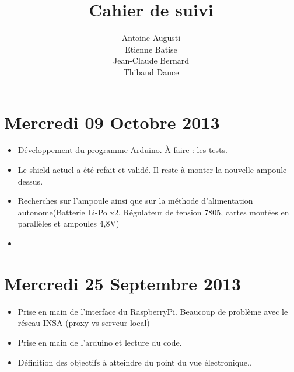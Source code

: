 \documentclass[a4paper, 12pt, french]{article}
\title{Cahier de suivi}
\author{Antoine Augusti\\ Etienne Batise\\ Jean-Claude Bernard\\ Thibaud Dauce}
\begin{document}
\maketitle

	\section{Mercredi 09 Octobre 2013} %
	\label{sec:mercredi_09_octobre_2013}
	\begin{itemize}
		\item Développement du programme Arduino. À faire : les tests.
		\item Le shield actuel a été refait et validé. Il reste à monter la nouvelle ampoule dessus.
		\item Recherches sur l'ampoule ainsi que sur la méthode d'alimentation autonome(Batterie Li-Po x2, Régulateur de tension 7805, cartes montées en parallèles et ampoules 4,8V)
		\item
	\end{itemize}

	\section{Mercredi 25 Septembre 2013} %
	\label{sec:mercredi_25_septembre_2013}
	\begin{itemize}
			\item Prise en main de l'interface du RaspberryPi. Beaucoup de problème avec le réseau INSA (proxy vs serveur local)
			\item Prise en main de l'arduino et lecture du code.
			\item Définition des objectifs à atteindre du point du vue électronique..
	\end{itemize}	
\end{document}
